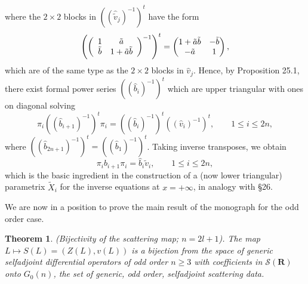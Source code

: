 \documentclass{surv-l}
\theoremstyle{plain}
\newtheorem{theorem}{Theorem}[section]
\theoremstyle{definition}
\numberwithin{equation}{chapter}
\begin{document}
where the $2\times 2$ blocks in $(({\hat{\tilde{v}}}_{j})^{-1})^{t}$ have the form
\begin{equation*}
\left(\left(\begin{array}{cc}
1 & \tilde{a}  \\
\tilde{b} & 1+\tilde{a}\tilde{b}
\end{array}\right)^{-1}\right)^{t}=\left(\begin{array}{@{}cc@{}}
1+\tilde{a}\tilde{b} & -\tilde{b}\\
-\tilde{a} & 1
\end{array}\right),
\end{equation*}
which are of the same type as the $2\times 2$ blocks in $\hat{v}_{j}$. Hence, by Proposition 25.1, there exist formal power series $((\hat{b}_{i})^{-1})^{t}$ which are upper triangular with ones on diagonal solving
\begin{equation}\label{eq32.14}
\pi_{i}((\hat{b}_{i+1})^{-1})^{t}\pi_{i}=((\hat{b}_{i})^{-1})^{t}((\hat{v}_{i})^{-1})^{t},\qquad 1\leq i\leq 2n,
\end{equation}
where $((\hat{b}_{2n+1})^{-1})^{t}=((\hat{b}_{1})^{-1})^{t}$. Taking inverse transposes, we obtain
\begin{equation}\label{eq32.15}
\pi_{i}\hat{b}_{i+1}\pi_{i}=\hat{b}_{i}\tilde{v}_{i},\qquad 1\leq i\leq 2n,
\end{equation}
which is the basic ingredient in the construction of a (now lower triangular) parametrix $\tilde{X}_{i}$ for the inverse equations at $ x=+\infty$, in analogy with \S 26. \qquad

We are now in a position to prove the main result of the monograph for the odd order case.
\setcounter{theorem}{15}
\begin{theorem}\label{thm32.16}
\emph{(Bijectivity of the scattering map; $n=2l+1$)}. The map $L\mapsto S(L)=(Z(L),v(L))$ is a bijection from the space of generic selfadjoint differential operators of odd order $n\geq 3$ with coefficients in $\mathscr{S}(\mathbf{R})$ onto $G_{0}(n)$, the set of generic, odd order, selfadjoint scattering data.
\end{theorem}
\end{document}

